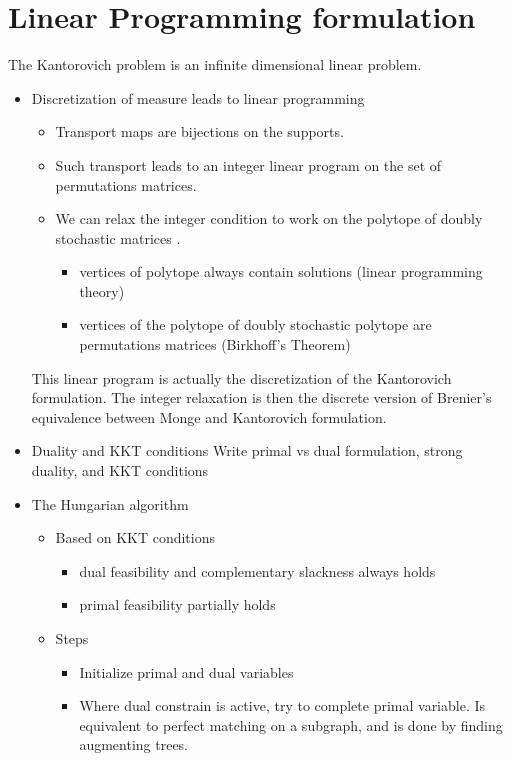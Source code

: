 \documentclass[a4paper]{article}
\theoremstyle{definition}
\theoremstyle{remark}
\begin{document}
\section{Linear Programming formulation}
The Kantorovich problem is an infinite dimensional linear problem.
\begin{itemize}
    \item Discretization of measure leads to linear programming
    \begin{itemize}
        \item Transport maps are bijections on the supports.
        \item Such transport leads to an integer linear program on the set of permutations matrices.
        \item We can relax the integer condition to work on the polytope of doubly stochastic matrices .
        \begin{itemize}
            \item vertices of polytope always contain solutions (linear programming theory)
            \item vertices of the polytope of doubly stochastic polytope are permutations matrices (Birkhoff's Theorem)
        \end{itemize}
    \end{itemize}
    This linear program is actually the discretization of the Kantorovich formulation. The integer relaxation is then the discrete version of Brenier's equivalence between Monge and Kantorovich formulation.
    \item Duality and KKT conditions
    Write primal vs dual formulation, strong duality, and KKT conditions
    \item The Hungarian algorithm
    \begin{itemize}
        \item Based on KKT conditions
        \begin{itemize}
            \item dual feasibility and complementary slackness always holds
            \item primal feasibility partially holds
        \end{itemize}
        \item Steps
        \begin{itemize}
            \item Initialize primal and dual variables
            \item Where dual constrain is active, try to complete primal variable. Is equivalent to perfect matching on a subgraph, and is done by finding augmenting trees.

\end{itemize}
\end{itemize}
\end{itemize}
\end{document}
